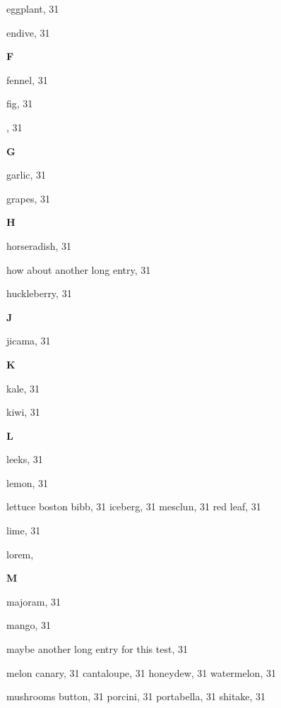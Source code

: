 \begin{theindex}
  \item eggplant, 31
  \item endive, 31

  \indexspace
{\sffamily\bfseries{F}}\nopagebreak

  \item fennel, 31
  \item fig, 31
  \item {}, 31

  \indexspace
{\sffamily\bfseries{G}}\nopagebreak

  \item garlic, 31
  \item grapes, 31

  \indexspace
{\sffamily\bfseries{H}}\nopagebreak

  \item horseradish, 31
  \item how about another long entry, 31
  \item huckleberry, 31

  \indexspace
{\sffamily\bfseries{J}}\nopagebreak

  \item jicama, 31

  \indexspace
{\sffamily\bfseries{K}}\nopagebreak

  \item kale, 31
  \item kiwi, 31

  \indexspace
{\sffamily\bfseries{L}}\nopagebreak

  \item leeks, 31
  \item lemon, 31
  \item lettuce
    \subitem boston bibb, 31
    \subitem iceberg, 31
    \subitem mesclun, 31
    \subitem red leaf, 31
  \item lime, 31
  \item lorem, 

  \indexspace
{\sffamily\bfseries{M}}\nopagebreak

  \item majoram, 31
  \item mango, 31
  \item maybe another long entry for this test, 31
  \item melon
    \subitem canary, 31
    \subitem cantaloupe, 31
    \subitem honeydew, 31
    \subitem watermelon, 31
  \item mushrooms
    \subitem button, 31
    \subitem porcini, 31
    \subitem portabella, 31
    \subitem shitake, 31


\end{theindex}
